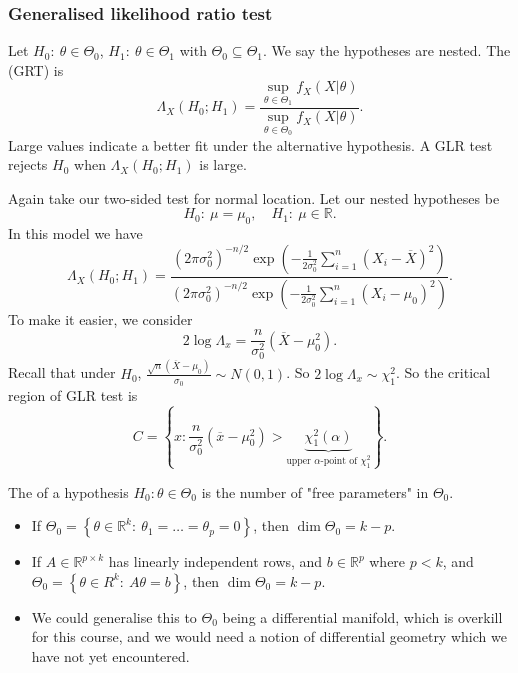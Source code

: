 \documentclass[egregdoesnotlikesansseriftitles,a4paper]{scrartcl}
\begin{document}
\subsubsection*{Generalised likelihood ratio test}
Let $H_0 : \ \theta \in \Theta_0 $, $H_1 : \ \theta \in \Theta_1 $ with $\Theta_0 \subseteq \Theta_1 $. We say the hypotheses are nested. The  (GRT) is \[
\Lambda_{X}(H_0 ; H_1 )= \frac{\sup_{\theta \in \Theta_1 }f_{X}(X| \theta)}{\sup_{\theta \in \Theta_0 }f_{X}(X| \theta)}
.\] Large values indicate a better fit under the alternative hypothesis. A GLR test rejects $H_0 $ when $\Lambda_{X}(H_0 ; H_1 )$ is large.
\begin{example*}
       Again take our two-sided test for normal location. Let our nested hypotheses be \[
       H_0 :\ \mu=\mu_0 , \quad H_1 : \ \mu \in \mathbb{R}
       .\] In this model we have \[
            \Lambda_{X}(H_0 ; H_1 )= \frac{(2\pi \sigma_0 ^2)^{-n/2}\exp(- \frac{1}{2 \sigma_0 ^2}\sum_{i=1}^{n}(X_i-\overline{X})^2)}{(2\pi \sigma_0 ^2)^{-n/2}\exp(- \frac{1}{2 \sigma_0 ^2}\sum_{i=1}^{n}(X_i-\mu_0 )^2)}
       .\] To make it easier, we consider \[
       2 \log \Lambda_{x}=\frac{n}{\sigma_0 ^2}(\overline{X}-\mu_0 ^2)
       .\] Recall that under $H_0 $, $ \frac{\sqrt{n} (\overline{X}-\mu_0 )}{\sigma_0 }\sim N (0,1)$. So $2 \log \Lambda_{x} \sim \chi^2_1$. So the critical region of GLR test is \[
       C=\left\{x: \frac{n}{\sigma_0 ^2}(\overline{x}-\mu_0 ^2)>\underbrace{\chi_1 ^2 (\alpha)}_{\text{upper } \alpha \text{-point of } \chi^2_1 } \right\}
       .\]
\end{example*}
\begin{definition*}
     The  of a hypothesis $H_0 : \theta \in \Theta_0 $ is the number of "free parameters" in $\Theta_0 $.
     \begin{example*}
           \begin{itemize}
                \item If $\Theta_0 =\left\{\theta \in \mathbb{R}^{k}: \ \theta_1 =\ldots=\theta_{p}=0\right\}$, then $\operatorname{dim}\Theta_0 =k-p$. 
               \item If $A \in \mathbb{R}^{p\times k}$ has linearly independent rows, and $b \in \mathbb{R}^{p}$ where $p<k$, and $\Theta_0 =\left\{\theta \in R^{k}: \ A \theta=b\right\}$, then $\operatorname{dim}\Theta_0 =k-p$.
               \item We could generalise this to $\Theta_0 $ being a differential manifold, which is overkill for this course, and we would need a notion of differential geometry which we have not yet encountered.
           \end{itemize}
     \end{example*}
\end{definition*}
\end{document}
